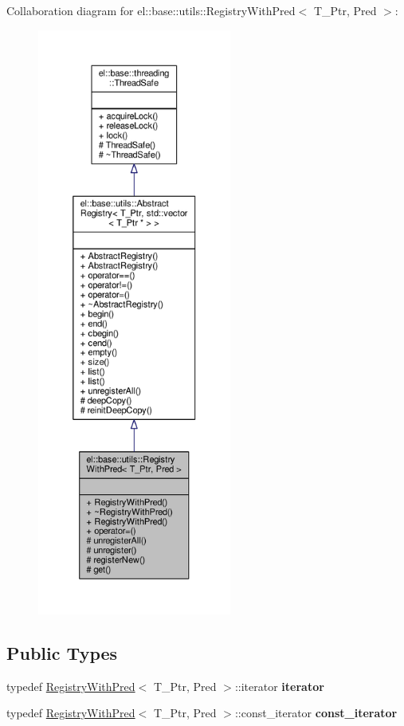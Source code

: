 Collaboration diagram for el\+:\+:base\+:\+:utils\+:\+:Registry\+With\+Pred$<$ T\+\_\+\+Ptr, Pred $>$\+:
\nopagebreak
\begin{figure}[H]
\begin{center}
\leavevmode
\includegraphics[height=550pt]{de/de0/classel_1_1base_1_1utils_1_1RegistryWithPred__coll__graph}
\end{center}
\end{figure}
\subsection*{Public Types}
\begin{DoxyCompactItemize}
\item 
typedef \hyperlink{classel_1_1base_1_1utils_1_1RegistryWithPred}{Registry\+With\+Pred}$<$ T\+\_\+\+Ptr, Pred $>$\+::iterator {\bfseries iterator}\hypertarget{classel_1_1base_1_1utils_1_1RegistryWithPred_afc03d2d0a72f5ebf03e1e3b37bd9932d}{}\label{classel_1_1base_1_1utils_1_1RegistryWithPred_afc03d2d0a72f5ebf03e1e3b37bd9932d}

\item 
typedef \hyperlink{classel_1_1base_1_1utils_1_1RegistryWithPred}{Registry\+With\+Pred}$<$ T\+\_\+\+Ptr, Pred $>$\+::const\+\_\+iterator {\bfseries const\+\_\+iterator}\hypertarget{classel_1_1base_1_1utils_1_1RegistryWithPred_ad9af7a8eeedd58a75eb70bccb334f6dc}{}\label{classel_1_1base_1_1utils_1_1RegistryWithPred_ad9af7a8eeedd58a75eb70bccb334f6dc}

\end{DoxyCompactItemize}
